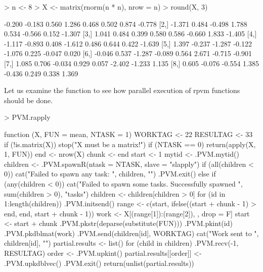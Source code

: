 \begin{Schunk}
\begin{Sinput}
> n <- 8
> X <- matrix(rnorm(n * n), nrow = n)
> round(X, 3)
\end{Sinput}
\begin{Soutput}
       [,1]   [,2]   [,3]   [,4]   [,5]   [,6]   [,7]   [,8]
[1,] -0.200 -0.183  0.560  1.286  0.468  0.502  0.874 -0.778
[2,] -1.371  0.484 -0.498  1.788  0.534 -0.566  0.152 -1.307
[3,]  1.041  0.484  0.399  0.580  0.586 -0.660  1.833 -1.405
[4,] -1.117 -0.893  0.408 -1.612  0.486  0.644  0.422 -1.639
[5,]  1.397 -0.237 -1.287 -0.122 -1.076  0.225 -0.047  0.020
[6,] -0.046  0.537 -1.287 -0.089  0.564  2.671 -0.715 -0.901
[7,]  1.085  0.706 -0.034  0.929  0.057 -2.402 -1.233  1.135
[8,]  0.605 -0.076 -0.554  1.385 -0.436  0.249  0.338  1.369
\end{Soutput}
\end{Schunk}

Let us examine the function to see how parallel execution of rpvm
functions should be done. 

\begin{Schunk}
\begin{Sinput}
> PVM.rapply
\end{Sinput}
\begin{Soutput}
function (X, FUN = mean, NTASK = 1) 
{
    WORKTAG <- 22
    RESULTAG <- 33
    if (!is.matrix(X)) {
        stop("X must be a matrix!")
    }
    if (NTASK == 0) {
        return(apply(X, 1, FUN))
    }
    end <- nrow(X)
    chunk <- end%/%NTASK + 1
    start <- 1
    mytid <- .PVM.mytid()
    children <- .PVM.spawnR(ntask = NTASK, slave = "slapply")
    if (all(children < 0)) {
        cat("Failed to spawn any task: ", children, "\n")
        .PVM.exit()
    }
    else if (any(children < 0)) {
        cat("Failed to spawn some tasks.  Successfully spawned ", 
            sum(children > 0), "tasks\n")
        children <- children[children > 0]
    }
    for (id in 1:length(children)) {
        .PVM.initsend()
        range <- c(start, ifelse((start + chunk - 1) > end, end, 
            start + chunk - 1))
        work <- X[(range[1]):(range[2]), , drop = F]
        start <- start + chunk
        .PVM.pkstr(deparse(substitute(FUN)))
        .PVM.pkint(id)
        .PVM.pkdblmat(work)
        .PVM.send(children[id], WORKTAG)
        cat("Work sent to ", children[id], "\n")
    }
    partial.results <- list()
    for (child in children) {
        .PVM.recv(-1, RESULTAG)
        order <- .PVM.upkint()
        partial.results[[order]] <- .PVM.upkdblvec()
    }
    .PVM.exit()
    return(unlist(partial.results))
}
\end{Soutput}
\end{Schunk}

